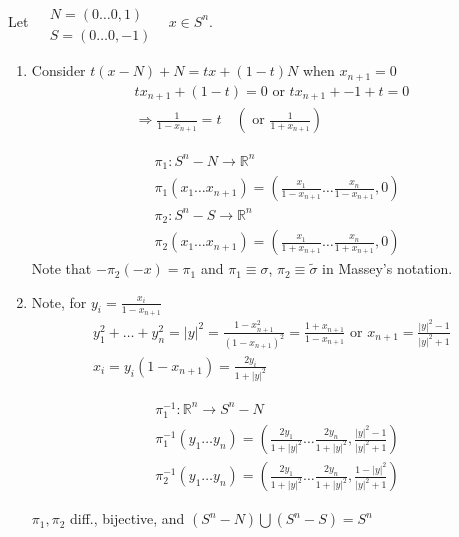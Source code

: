 \documentclass[11pt]{amsart}
\theoremstyle{definition}
\begin{document}
Let $\begin{aligned} & \quad \\
  & N = (0 \dots 0, 1) \\
  & S = (0 \dots 0, -1) \end{aligned}$ \quad \, $x\in S^n$.
\begin{enumerate}
\item[(a)]
 Consider $t(x-N) + N = tx + (1-t)N$ when $x_{n+1} =0$
\[
\begin{gathered}
  tx_{n+1} + (1-t) = 0 \text{ or } tx_{n+1} + -1 + t = 0 \\
  \Longrightarrow \frac{ 1}{ 1- x_{n+1} } = t \quad \left( \text{ or } \frac{1}{ 1 + x_{n+1} } \right)
\end{gathered}
\]

\[
\begin{aligned}
  & \pi_1: S^n - N \to \mathbb{R}^n \\
  & \pi_1(x_1 \dots x_{n+1}) = \left( \frac{x_1}{ 1 - x_{n+1} } \dots \frac{x_n}{ 1 - x_{n+1} } , 0 \right) \\
  & \pi_2 : S^n -S \to \mathbb{R}^n \\
  & \pi_2(x_1 \dots x_{n+1}) = \left( \frac{x_1}{ 1 + x_{n+1}} \dots \frac{x_n}{ 1 + x_{n+1} }, 0 \right)
\end{aligned}
\]
Note that $-\pi_2(-x) = \pi_1$ and $\pi_1 \equiv \sigma$, $\pi_2 \equiv \widetilde{\sigma}$ in Massey's notation.
\item[(b)] Note, for $y_i = \frac{x_i}{ 1 - x_{n+1}}$
\[
\begin{gathered}
  y_1^2 + \dots +y_n^2 = |y|^2 = \frac{1-  x_{n+1}^2}{ (1-x_{n+1})^2 } = \frac{1+ x_{n+1}}{ 1- x_{n+1}} \text{ or } x_{n+1}  = \frac{ |y|^2 - 1 }{ |y|^2 + 1 }  \\
  x_i = y _i (1- x_{n+1}) = \frac{2y_i}{ 1 + |y|^2 }
\end{gathered}
\]

\[
\begin{aligned}
  & \pi_1^{-1}: \mathbb{R}^n \to S^n - N \\
  & \pi_1^{-1}(y_1 \dots y_n) = \left( \frac{2y_1}{ 1 + |y|^2 } \dots \frac{2y_n}{1+ |y|^2 } , \frac{ |y|^2 - 1 }{ |y|^2 + 1 } \right) \\
  & \pi_2^{-1}(y_1 \dots y_n) = \left( \frac{2y_1}{ 1 + |y|^2 } \dots \frac{2y_n}{1+ |y|^2 } , \frac{ 1 - |y|^2  }{ |y|^2 + 1 } \right)
\end{aligned}
\]

$\pi_1,\pi_2$ diff., bijective, and $(S^n - N ) \bigcup (S^n-S) = S^n$ \\


\end{enumerate}
\end{document}
